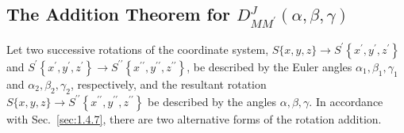 \subsection{The Addition Theorem for $D_{M M^{\prime}}^{J}(\alpha, \beta, \gamma)$}\label{sec:4.7.1}
Let two successive rotations of the coordinate system, $S\{x, y, z\} \rightarrow S^{\prime}\left\{x^{\prime}, y^{\prime}, z^{\prime}\right\}$ and $S^{\prime}\left\{x^{\prime}, y^{\prime}, z^{\prime}\right\} \rightarrow S^{\prime \prime}\left\{x^{\prime \prime}, y^{\prime \prime}, z^{\prime \prime}\right\}$, be described by the Euler angles $\alpha_{1}, \beta_{1}, \gamma_{1}$ and $\alpha_{2}, \beta_{2}, \gamma_{2}$, respectively, and the resultant rotation $S\{x, y, z\} \rightarrow S^{\prime \prime}\left\{x^{\prime \prime}, y^{\prime \prime}, z^{\prime \prime}\right\}$ be described by the angles $\alpha, \beta, \gamma$. In accordance with Sec.~\ref{sec:1.4.7}, there are two alternative forms of the rotation addition.
